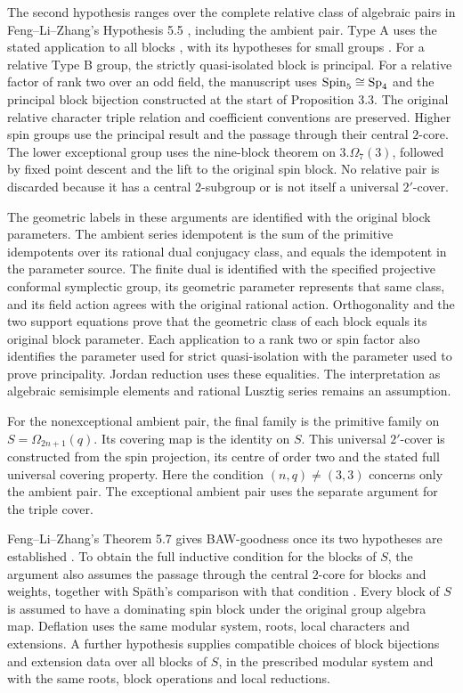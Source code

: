 The second hypothesis ranges over the complete relative class of
algebraic pairs in Feng--Li--Zhang's Hypothesis 5.5
\cite{FengLiZhang2022Jordan}, including the ambient pair.
Type A uses the stated application to all blocks
\cite{FengLiZhang2023Morita}, with its hypotheses for small groups
\cite{FengLiZhang2023LowRankA}.
For a relative Type B group, the strictly quasi-isolated block is
principal. For a relative factor of rank two over an odd field, the
manuscript uses $\operatorname{Spin}_5\cong\operatorname{Sp}_4$ and the principal block bijection
constructed at the start of Proposition 3.3. The original
relative character triple relation and coefficient conventions are
preserved. Higher spin groups use the
principal result and the passage through their central
$2$-core. The lower exceptional group uses the nine-block theorem
on $3.\Omega_7(3)$, followed by fixed point descent and the lift
to the original spin block. No relative pair is discarded because
it has a central $2$-subgroup or is not itself a universal
$2'$-cover.

The geometric labels in these arguments are identified with the
original block parameters. The ambient series idempotent
is the sum of the primitive idempotents over its rational
dual conjugacy class, and equals the idempotent in the parameter
source. The finite dual is identified with the specified projective
conformal symplectic group, its geometric parameter represents
that same class, and its field action agrees with the original
rational action. Orthogonality and the two support equations prove
that the geometric class of each block equals its original block
parameter. Each application to a rank two or spin factor also identifies the
parameter used for strict quasi-isolation with the parameter used to prove
principality.
Jordan reduction uses these equalities. The interpretation
as algebraic semisimple elements and rational Lusztig series remains
an assumption.

For the nonexceptional ambient pair, the final family is the
primitive family on $S=\Omega_{2n+1}(q)$. Its covering map is the
identity on $S$. This universal $2'$-cover
is constructed from the spin projection, its centre of order two
and the stated full universal covering property. Here the condition
$(n,q)\ne(3,3)$ concerns only the ambient pair. The
exceptional ambient pair uses the separate argument for the triple cover.

Feng--Li--Zhang's Theorem 5.7 gives BAW-goodness once its two hypotheses
are established \cite{FengLiZhang2022Jordan}. To obtain the full inductive
condition for the blocks of $S$, the argument also assumes the passage
through the central $2$-core for blocks and weights, together with
Sp\"ath's comparison with that condition
\cite[Theorem~4.4]{Spath2017Triples}. Every block of $S$ is
assumed to have a dominating spin block under the original group algebra
map. Deflation uses the same modular system, roots, local characters
and extensions. A further hypothesis supplies compatible choices of
block bijections and extension data over all blocks of $S$, in the
prescribed modular system and with the same roots, block operations
and local reductions.


